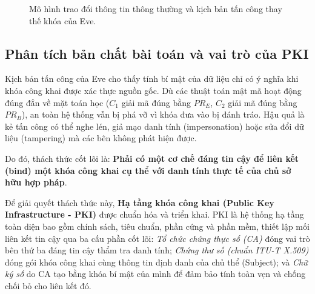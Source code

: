 \begin{figure}[!htbp]
\centering

\caption{Mô hình trao đổi thông tin thông thường và kịch bản tấn công thay thế khóa của Eve.}
\label{fig:mitm-key-exchange}
\end{figure}

\subsection{Phân tích bản chất bài toán và vai trò của PKI}
\label{subsec:analysis-pki-role}
Kịch bản tấn công của Eve cho thấy tính bí mật của dữ liệu chỉ có ý nghĩa khi khóa công khai được xác thực nguồn gốc. Dù các thuật toán mật mã hoạt động đúng đắn về mặt toán học ($C_1$ giải mã đúng bằng $PR_E$, $C_2$ giải mã đúng bằng $PR_B$), an toàn hệ thống vẫn bị phá vỡ vì khóa đưa vào bị đánh tráo. Hậu quả là kẻ tấn công có thể nghe lén, giả mạo danh tính (impersonation) hoặc sửa đổi dữ liệu (tampering) mà các bên không phát hiện được.

Do đó, thách thức cốt lõi là: \textbf{Phải có một cơ chế đáng tin cậy để liên kết (bind) một khóa công khai cụ thể với danh tính thực tế của chủ sở hữu hợp pháp}.

Để giải quyết thách thức này, \textbf{Hạ tầng khóa công khai (Public Key Infrastructure - PKI)} được chuẩn hóa và triển khai. PKI là hệ thống hạ tầng toàn diện bao gồm chính sách, tiêu chuẩn, phần cứng và phần mềm, thiết lập mối liên kết tin cậy qua ba cấu phần cốt lõi: \textit{Tổ chức chứng thực số (CA)} đóng vai trò bên thứ ba đáng tin cậy thẩm tra danh tính; \textit{Chứng thư số (chuẩn ITU-T X.509)} đóng gói khóa công khai cùng thông tin định danh của chủ thể (Subject); và \textit{Chữ ký số} do CA tạo bằng khóa bí mật của mình để đảm bảo tính toàn vẹn và chống chối bỏ cho liên kết đó.

